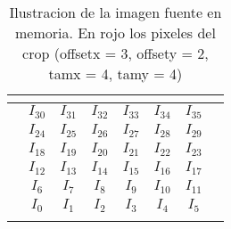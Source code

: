 \begin{table}[h]
\centering
\mem
\begin{tabular}{l|c|c|c|c|c|c|l}
 & \multicolumn{1}{l|}{}      & \multicolumn{1}{l|}{}       & \multicolumn{1}{l|}{}       & \multicolumn{1}{l|}{}       & \multicolumn{1}{l|}{}       & \multicolumn{1}{l|}{}      &  \\ \hline
 & \cellcolor[HTML]{FFCB2F}$I_{30}$ & \cellcolor[HTML]{FFCB2F}$I_{31}$  & \cellcolor[HTML]{FFCB2F}$I_{32}$  & \cellcolor[HTML]{FD6864}$I_{33}$  & \cellcolor[HTML]{FD6864}$I_{34}$  & \cellcolor[HTML]{FD6864}$I_{35}$ &  \\ \hline
 & \cellcolor[HTML]{FFCB2F}$I_{24}$ & \cellcolor[HTML]{FFCB2F}$I_{25}$  & \cellcolor[HTML]{FFCB2F}$I_{26}$  & \cellcolor[HTML]{FD6864}$I_{27}$  & \cellcolor[HTML]{FD6864}$I_{28}$  & \cellcolor[HTML]{FD6864}$I_{29}$ &  \\ \hline
 & \cellcolor[HTML]{FFCB2F}$I_{18}$ & \cellcolor[HTML]{FFCB2F}$I_{19}$ & \cellcolor[HTML]{FFCB2F}$I_{20}$ & \cellcolor[HTML]{FD6864}$I_{21}$ & \cellcolor[HTML]{FD6864}$I_{22}$  & \cellcolor[HTML]{FD6864}$I_{23}$ &  \\ \hline
 & \cellcolor[HTML]{FFCB2F}$I_{12}$ & \cellcolor[HTML]{FFCB2F}$I_{13}$ & \cellcolor[HTML]{FFCB2F}$I_{14}$ & \cellcolor[HTML]{FD6864}$I_{15}$ & \cellcolor[HTML]{FD6864}$I_{16}$  & \cellcolor[HTML]{FD6864}$I_{17}$ &  \\ \hline
 & \cellcolor[HTML]{FFCB2F}$I_{6}$ & \cellcolor[HTML]{FFCB2F}$I_{7}$ & \cellcolor[HTML]{FFCB2F}$I_{8}$ & \cellcolor[HTML]{FFCB2F}$I_{9}$ & \cellcolor[HTML]{FFCB2F}$I_{10}$  & \cellcolor[HTML]{FFCB2F}$I_{11}$ &  \\ \hline
 & \cellcolor[HTML]{FFCB2F}$I_{0}$ & \cellcolor[HTML]{FFCB2F}$I_{1}$ & \cellcolor[HTML]{FFCB2F}$I_{2}$ & \cellcolor[HTML]{FFCB2F}$I_{3}$ & \cellcolor[HTML]{FFCB2F}$I_{4}$  & \cellcolor[HTML]{FFCB2F}$I_{5}$ &  \\ \hline
 & \multicolumn{1}{l|}{}      & \multicolumn{1}{l|}{}       & \multicolumn{1}{l|}{}       & \multicolumn{1}{l|}{}       & \multicolumn{1}{l|}{}       & \multicolumn{1}{l|}{}      &
\end{tabular}
\caption{Ilustracion de la imagen fuente en memoria. En rojo los pixeles del crop \newline
(offsetx = 3, offsety = 2, tamx = 4, tamy = 4)}
\end{table}

